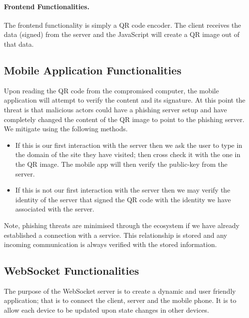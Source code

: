 \paragraph{Frontend Functionalities.} The frontend functionality is simply a QR code encoder. The client receives the data (signed) from the server and the JavaScript will create a QR image out of that data.

\subsection{Mobile Application Functionalities}
Upon reading the QR code from the compromised computer, the mobile application will attempt to verify the content and its signature. At this point the threat is that malicious actors could have a phishing server setup and have completely changed the content of the QR image to point to the phishing server. We mitigate using the following methods.

\begin{itemize}
    \item If this is our first interaction with the server then we ask the user to type in the domain of the site they have visited; then cross check it with the one in the QR image. The mobile app will then verify the public-key from the server.
    \item If this is not our first interaction with the server then we may verify the identity of the server that signed the QR code with the identity we have associated with the server.
\end{itemize}

Note, phishing threats are minimised through the \deeid ecosystem if we have already established a connection with a service. This relationship is stored and any incoming communication is always verified with the stored information. 

\vspace*{-0.5cm}
\subsection{WebSocket Functionalities}
\vspace*{-0.2cm}
The purpose of the WebSocket server is to create a dynamic and user friendly application; that is to connect the client, server and the mobile phone. It is to allow each device to be updated upon state changes in other devices.


